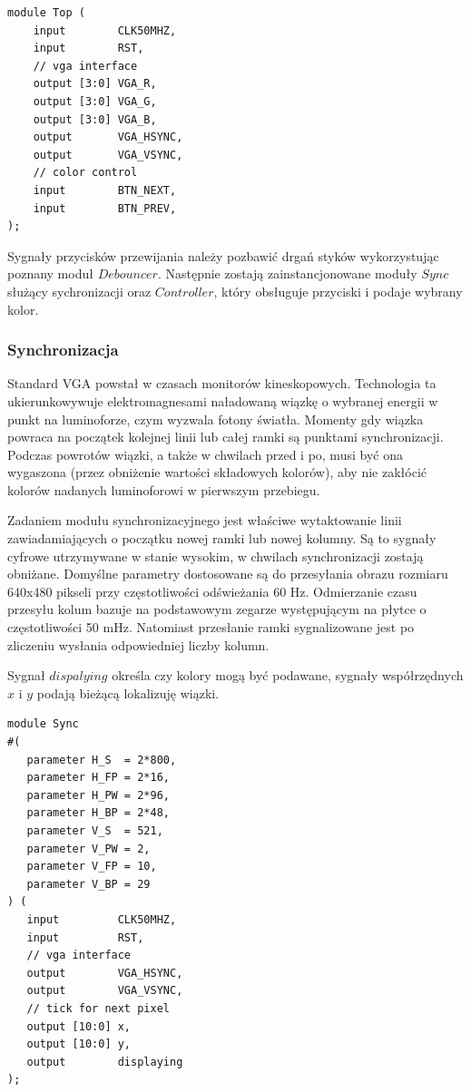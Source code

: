\documentclass[a4paper,12pt]{article}
\begin{document}
\begin{lstlisting}[label=Topvga,caption=Top.v]
module Top (
    input        CLK50MHZ,
    input        RST,
    // vga interface
    output [3:0] VGA_R,
    output [3:0] VGA_G,
    output [3:0] VGA_B,
    output       VGA_HSYNC,
    output       VGA_VSYNC,
    // color control
    input        BTN_NEXT,
    input        BTN_PREV,
);
\end{lstlisting}

Sygnały przycisków przewijania należy pozbawić drgań styków wykorzystując poznany moduł $Debouncer$. Następnie zostają zainstancjonowane moduły $Sync$ służący sychronizacji oraz $Controller$, który obsługuje przyciski i podaje wybrany kolor.

\subsubsection{Synchronizacja}
Standard VGA powstał w czasach monitorów kineskopowych. Technologia ta ukierunkowywuje elektromagnesami naładowaną wiązkę o wybranej energii w punkt na luminoforze, czym wyzwala fotony światła. Momenty gdy wiązka powraca na początek kolejnej linii lub całej ramki są punktami synchronizacji. Podczas powrotów wiązki, a także w chwilach przed i po, musi być ona wygaszona (przez obniżenie wartości składowych kolorów), aby nie zakłócić kolorów nadanych luminoforowi w pierwszym przebiegu.

Zadaniem modułu synchronizacyjnego jest właściwe wytaktowanie linii zawiadamiających o początku nowej ramki lub nowej kolumny. Są to sygnały cyfrowe utrzymywane w stanie wysokim, w chwilach synchronizacji zostają obniżane. Domyślne parametry dostosowane są do przesyłania obrazu rozmiaru 640x480 pikseli przy częstotliwości odświeżania 60 Hz. Odmierzanie czasu przesyłu kolum  bazuje na podstawowym zegarze występującym na płytce o częstotliwości 50 mHz. Natomiast przesłanie ramki sygnalizowane jest po zliczeniu wysłania odpowiedniej liczby kolumn.

Sygnał $dispalying$ określa czy kolory mogą być podawane, sygnały współrzędnych $x$ i $y$ podają bieżącą lokalizuję wiązki.

\begin{lstlisting}[label=Syncvga,caption=Sync.v]
module Sync
#(
   parameter H_S  = 2*800,
   parameter H_FP = 2*16,
   parameter H_PW = 2*96,
   parameter H_BP = 2*48,
   parameter V_S  = 521,
   parameter V_PW = 2,
   parameter V_FP = 10,
   parameter V_BP = 29
) (
   input         CLK50MHZ,
   input         RST,
   // vga interface
   output        VGA_HSYNC,
   output        VGA_VSYNC,
   // tick for next pixel
   output [10:0] x,
   output [10:0] y,
   output        displaying
);
\end{lstlisting}
\end{document}
